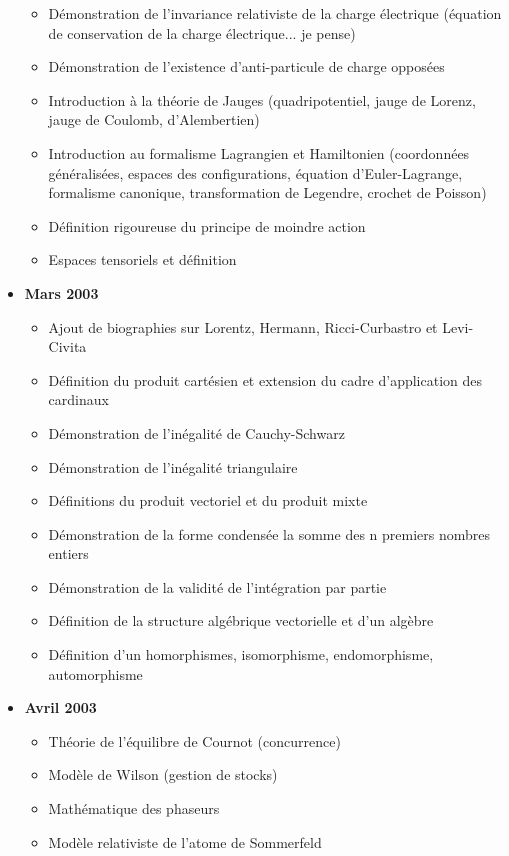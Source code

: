 \begin{itemize}
\begin{itemize}[noitemsep]
				\item Démonstration de l'invariance relativiste de la charge électrique (équation de conservation de la charge électrique... je pense)
				\item Démonstration de l'existence d'anti-particule de charge opposées
				\item Introduction à la théorie de Jauges (quadripotentiel, jauge de Lorenz, jauge de Coulomb, d'Alembertien)
				\item Introduction au formalisme Lagrangien et Hamiltonien (coordonnées généralisées, espaces des configurations, équation d'Euler-Lagrange, formalisme canonique, transformation de Legendre, crochet de Poisson)
				\item Définition rigoureuse du principe de moindre action
				\item Espaces tensoriels et définition
				\end{itemize}
		\item \textbf{Mars 2003}
			\begin{itemize}[noitemsep]
				\item Ajout de biographies sur Lorentz, Hermann, Ricci-Curbastro et Levi-Civita
				\item Définition du produit cartésien et extension du cadre d'application des cardinaux
				\item Démonstration de l'inégalité de Cauchy-Schwarz
				\item Démonstration de l'inégalité triangulaire
				\item Définitions du produit vectoriel et du produit mixte
				\item Démonstration de la forme condensée la somme des n premiers nombres entiers
				\item Démonstration de la validité de l'intégration par partie
				\item Définition de la structure algébrique vectorielle et d'un algèbre
				\item Définition d'un homorphismes, isomorphisme, endomorphisme, automorphisme
			\end{itemize}
		\item \textbf{Avril 2003}
			\begin{itemize}[noitemsep]
				\item Théorie de l'équilibre de Cournot (concurrence)
				\item Modèle de Wilson (gestion de stocks)
				\item Mathématique des phaseurs
				\item Modèle relativiste de l'atome de Sommerfeld

\end{itemize}
\end{itemize}
